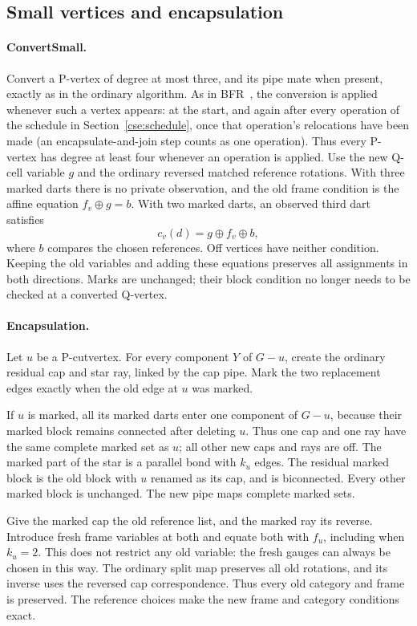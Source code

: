 \subsection{Small vertices and encapsulation}
\label{cse:small}

\paragraph{ConvertSmall.}
Convert a P-vertex of degree at most three, and its pipe mate when
present, exactly as in the ordinary algorithm. As in BFR~\cite[Section
3.1.1]{bfr}, the conversion is applied whenever such a vertex appears: at
the start, and again after every operation of the schedule in
Section~\ref{cse:schedule}, once that operation's relocations have been
made (an encapsulate-and-join step counts as one operation). Thus every
P-vertex has degree at least four whenever an operation is applied. Use the new Q-cell
variable $g$ and the ordinary reversed matched reference rotations.
With three marked darts there is no private observation, and the old
frame condition is the affine equation $f_v\oplus g=b$. With two marked
darts, an observed third dart satisfies
\[
 c_v(d)=g\oplus f_v\oplus b,
\]
where $b$ compares the chosen references. Off vertices have neither
condition. Keeping the old variables and adding these equations preserves
all assignments in both directions. Marks are unchanged; their block
condition no longer needs to be checked at a converted Q-vertex.

\paragraph{Encapsulation.}
Let $u$ be a P-cutvertex. For every component $Y$ of $G-u$, create the
ordinary residual cap and star ray, linked by the cap pipe. Mark the two
replacement edges exactly when the old edge at $u$ was marked.

If $u$ is marked, all its marked darts enter one component of $G-u$,
because their marked block remains connected after deleting $u$. Thus
one cap and one ray have the same complete marked set as $u$; all other
new caps and rays are off. The marked part of the star is a parallel
bond with $k_u$ edges. The residual marked block is the old block with
$u$ renamed as its cap, and is biconnected. Every other marked block is
unchanged. The new pipe maps complete marked sets.

Give the marked cap the old reference list, and the marked ray its
reverse. Introduce fresh frame variables at both and equate both with
$f_u$, including when $k_u=2$. This does not restrict any old variable:
the fresh gauges can always be chosen in this way. The ordinary split
map preserves all old rotations, and its inverse uses the reversed cap
correspondence. Thus every old category and frame is preserved. The
reference choices make the new frame and category conditions exact.


